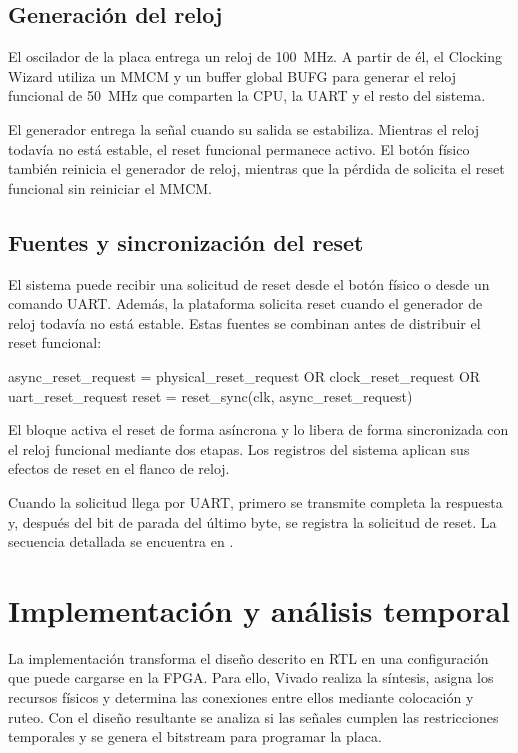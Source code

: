 \subsection{Generación del reloj}

El oscilador de la placa entrega un reloj de \SI{100}{\mega\hertz}. A partir
de él, el Clocking Wizard utiliza un MMCM y un buffer global BUFG para generar
el reloj funcional de \SI{50}{\mega\hertz} que comparten la CPU, la UART y el
resto del sistema.

El generador entrega la señal  cuando su salida se estabiliza.
Mientras el reloj todavía no está estable, el reset funcional permanece
activo. El botón físico también reinicia el generador de reloj, mientras que la
pérdida de  solicita el reset funcional sin reiniciar el MMCM.

\subsection{Fuentes y sincronización del reset}

El sistema puede recibir una solicitud de reset desde el botón físico o desde
un comando UART. Además, la plataforma solicita reset cuando el generador de
reloj todavía no está estable. Estas fuentes se combinan antes de distribuir
el reset funcional:

\begin{codebox}
async_reset_request = physical_reset_request
                      OR clock_reset_request
                      OR uart_reset_request
reset = reset_sync(clk, async_reset_request)
\end{codebox}

El bloque  activa el reset de forma asíncrona y lo libera de
forma sincronizada con el reloj funcional mediante dos etapas. Los registros
del sistema aplican sus efectos de reset en el flanco de reloj.

Cuando la solicitud llega por UART, primero se transmite completa la respuesta
 y, después del bit de parada del último byte, se registra
la solicitud de reset. La secuencia detallada se encuentra en
.

\section{Implementación y análisis temporal}

La implementación transforma el diseño descrito en RTL en una configuración
que puede cargarse en la FPGA. Para ello, Vivado realiza la síntesis, asigna los
recursos físicos y determina las conexiones entre ellos mediante colocación y
ruteo. Con el diseño resultante se analiza si las señales cumplen las
restricciones temporales y se genera el bitstream para programar la placa.

